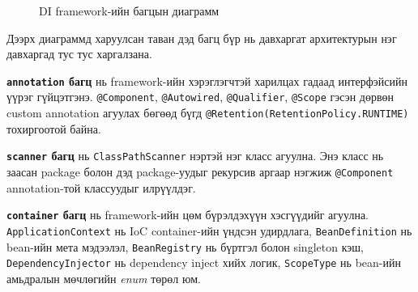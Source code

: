 \begin{figure}[H]
\caption{DI framework-ийн багцын диаграмм}
\label{fig:package-diagram}
\end{figure}


Дээрх диаграммд харуулсан таван дэд багц бүр нь давхаргат
архитектурын нэг давхаргад тус тус харгалзана.

\textbf{\texttt{annotation} багц} нь framework-ийн хэрэглэгчтэй
харилцах гадаад интерфэйсийн үүрэг гүйцэтгэнэ.
\texttt{@Component}, \texttt{@Autowired}, \texttt{@Qualifier},
\texttt{@Scope} гэсэн дөрвөн custom annotation агуулах бөгөөд
бүгд \texttt{@Retention(RetentionPolicy.RUNTIME)} тохиргоотой
байна.

\textbf{\texttt{scanner} багц} нь \texttt{ClassPathScanner}
нэртэй нэг класс агуулна. Энэ класс нь заасан package болон
дэд package-уудыг рекурсив аргаар нэгжиж
\texttt{@Component} annotation-той классуудыг илрүүлдэг.

\textbf{\texttt{container} багц} нь framework-ийн цөм бүрэлдэхүүн
хэсгүүдийг агуулна. \texttt{ApplicationContext} нь IoC
container-ийн үндсэн удирдлага, \texttt{BeanDefinition} нь
bean-ийн мета мэдээлэл, \texttt{BeanRegistry} нь бүртгэл болон
singleton кэш, \texttt{DependencyInjector} нь dependency
inject хийх логик, \texttt{ScopeType} нь bean-ийн амьдралын
мөчлөгийн \textit{enum} төрөл юм.

